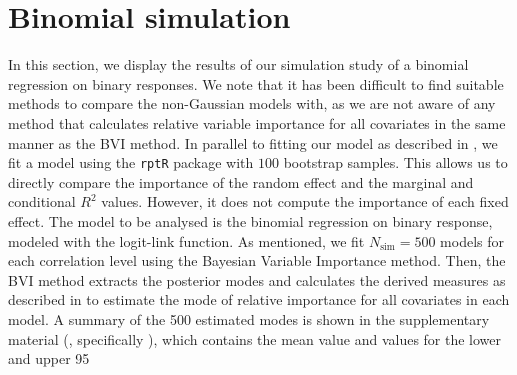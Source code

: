 \section{Binomial simulation}
In this section, we display the results of our simulation study of a binomial regression on binary responses. We note that it has been difficult to find suitable methods to compare the non-Gaussian models with, as we are not aware of any method that calculates relative variable importance for all covariates in the same manner as the BVI method. In parallel to fitting our model as described in , we fit a model using the \texttt{rptR} package with $100$ bootstrap samples. This allows us to directly compare the importance of the random effect and the marginal and conditional $R^2$ values. However, it does not compute the importance of each fixed effect. The model to be analysed is the binomial regression on binary response, modeled with the logit-link function. As mentioned, we fit \( N_{\text{sim}} = 500 \) models for each correlation level using the Bayesian Variable Importance method. Then, the BVI method extracts the posterior modes and calculates the derived measures as described in  to estimate the mode of relative importance for all covariates in each model. A summary of the 500 estimated modes is shown in the supplementary material (, specifically ), which contains the mean value and values for the lower and upper 95%
